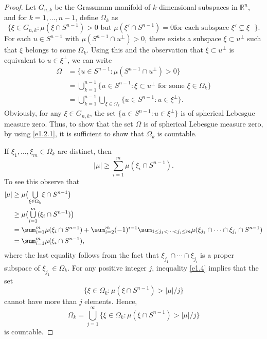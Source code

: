 \documentclass{cpamart1}     %
\theoremstyle{definition}
\theoremstyle{remark}
\newcommand*{\medcup}{\mathsmaller{\bigcup}}%
\newcommand{\rn}{\mathbb R^n}
\newcommand{\sn}{S^{n-1}}
\begin{document}
\begin{proof}
Let $G_{n,k}$ be the Grassmann manifold of $k$-dimensional subspaces in $\rn$,
and for $k=1, \ldots, n-1$, define $\Omega_k$ as
\[
\{\xi\in G_{n,k} :\text{$\mu(\xi\cap \sn)>0$  but $\mu(\xi'\cap \sn)=0$
 for each subspace $\xi' \subsetneq \xi$ } \}.
\]
For each $u\in S^{n-1}$ with $\mu(S^{n-1}\cap u^\perp)>0$,
there exists a subspace $\xi\subset u^\perp$ such that $\xi$ belongs to some $\Omega_k$.
Using this and the observation that
$\xi \subset u^\bot$ is equivalent to $u\in \xi^\bot$, we can write
\begin{align}
\Omega
&=
\{u\in S^{n-1} : \mu(S^{n-1}\cap u^\bot)>0 \}\nonumber\\
&=\bigcup_{k=1}^{n-1} \big\{u\in S^{n-1} :
   \xi \subset u^\bot \text{ for some } \xi \in \Omega_k\big\}  \label{e1.2.1}\\
&=\bigcup_{k=1}^{n-1} \bigcup_{\xi\in\Omega_k} \{u\in S^{n-1} : u\in\xi^\bot \}.\nonumber
\end{align}
Obviously, for any $\xi \in G_{n,k}$, the set $\{u\in S^{n-1} : u\in\xi^\bot \}$
is of spherical Lebesgue measure zero.
Thus, to show that the set $\Omega$
is of spherical Lebesgue measure zero,
by using \eqref{e1.2.1}, it is sufficient to show that
$\Omega_k$ is countable.

If $\xi_1,\ldots, \xi_m\in \Omega_k$ are distinct, then
\begin{equation}\label{e1.4}
|\mu| \ge \sum_{i=1}^m \mu(\xi_i\cap S^{n-1}).
\end{equation}
To see this observe that
\begin{align*}
|\mu| &\ge \mu\big(\medcup\limits_{\xi\in \Omega_k} \xi\cap S^{n-1}\big) \nonumber\\
&\ge \mu\big(\medcup\limits_{i=1}^m (\xi_i\cap S^{n-1}) \big) \nonumber\\
&=\sum_{i=1}^m \mu(\xi_i\cap S^{n-1})+
  \sum_{i=2}^m(-1)^{i-1}\sum_{1\leq j_1<\cdots<j_i\leq m}
  \mu(\xi_{j_1}\cap\cdots\cap \xi_{j_i}\cap S^{n-1}) \nonumber\\
&=\sum_{i=1}^m \mu(\xi_i\cap S^{n-1}),
\end{align*}
where the last equality follows from the fact that
$\xi_{j_1}\cap\cdots\cap \xi_{j_i}$ is a proper
subspace of $\xi_{j_1}\in \Omega_k$. For any positive integer $j$, inequality
\eqref{e1.4} implies that the set
\[
\big\{ \xi \in \Omega_k : \mu(\xi\cap \sn)> {|\mu|}/j\big\}
\]
cannot have more than $j$ elements. Hence,
\[
\Omega_k = \bigcup_{j=1}^\infty
  \big\{ \xi \in \Omega_k : \mu(\xi\cap \sn)> {|\mu|}/j\big\}
\]
is countable.
\end{proof}
\end{document}
